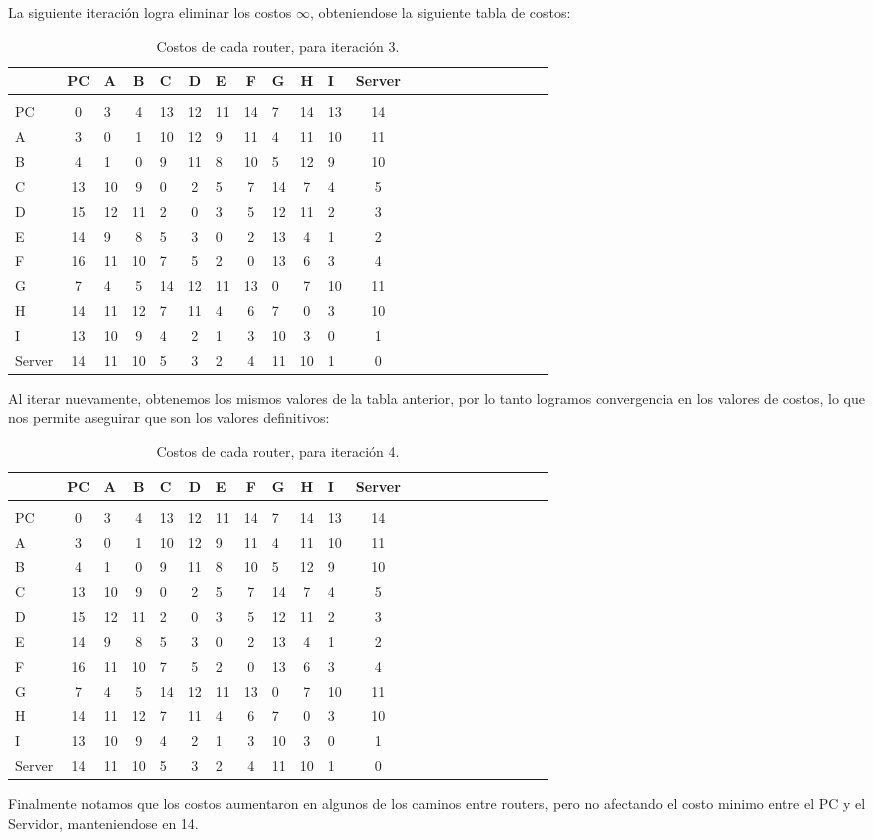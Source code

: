 \documentclass[a4papaer]{article}
\begin{document}
La siguiente iteración logra eliminar los costos $\infty$, obteniendose la siguiente tabla de costos:

\pagebreak

\begin{table}[h]
\centering
\begin{tabular}{lclclclclclclclclclclc}

& PC & A & B & C & D & E & F & G & H & I & Server \\\hline\\
PC&0&3&4&13&12&11&14&7&14&13&14 \\
A&3&0&1&10&12&9&11&4&11&10&11 \\
B&4&1&0&9&11&8&10&5&12&9&10 \\
C&13&10&9&0&2&5&7&14&7&4&5 \\
D&15&12&11&2&0&3&5&12&11&2&3 \\
E&14&9&8&5&3&0&2&13&4&1&2 \\
F&16&11&10&7&5&2&0&13&6&3&4 \\
G&7&4&5&14&12&11&13&0&7&10&11 \\
H&14&11&12&7&11&4&6&7&0&3&10 \\
I&13&10&9&4&2&1&3&10&3&0&1 \\
Server&14&11&10&5&3&2&4&11&10&1&0 \\

\end{tabular}
\caption{\label{tab:widgets}Costos de cada router, para iteración 3.}
\end{table}

Al iterar nuevamente, obtenemos los mismos valores de la tabla anterior, por lo tanto logramos convergencia en los valores de costos, lo que nos permite aseguirar que son los valores definitivos:

\begin{table}[h]
\centering
\begin{tabular}{lclclclclclclclclclclc}

& PC & A & B & C & D & E & F & G & H & I & Server \\\hline\\
PC&0&3&4&13&12&11&14&7&14&13&14 \\
A&3&0&1&10&12&9&11&4&11&10&11 \\
B&4&1&0&9&11&8&10&5&12&9&10 \\
C&13&10&9&0&2&5&7&14&7&4&5 \\
D&15&12&11&2&0&3&5&12&11&2&3 \\
E&14&9&8&5&3&0&2&13&4&1&2 \\
F&16&11&10&7&5&2&0&13&6&3&4 \\
G&7&4&5&14&12&11&13&0&7&10&11 \\
H&14&11&12&7&11&4&6&7&0&3&10 \\
I&13&10&9&4&2&1&3&10&3&0&1 \\
Server&14&11&10&5&3&2&4&11&10&1&0 \\

\end{tabular}
\caption{\label{tab:widgets}Costos de cada router, para iteración 4.}
\end{table}

Finalmente notamos que los costos aumentaron en algunos de los caminos entre routers, pero no afectando el costo minimo entre el PC y el Servidor, manteniendose en 14.
\end{document}
